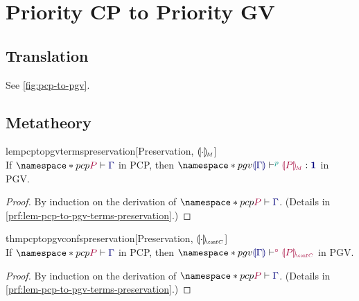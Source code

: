 \documentclass[main.tex]{subfiles}
\begin{document}
\section{Priority CP to Priority GV}

\subsection{Translation}
See \cref{fig:pcp-to-pgv}.


\subsection{Metatheory}

\begin{restatablelemma}{lempcptopgvtermspreservation}[Preservation, $\llparenthesis\cdot\rrparenthesis_{\!\scriptscriptstyle{M}}$]
  \label{lem:pcp-to-pgv-terms-preservation}
  \hfill\\%
  If $\pcp{\seq{P}{\ty{\Gamma}}}$ in PCP,
  then $\pgv{\tseq[\cs{p}]{\ty{\cpgvT{\Gamma}}}{\cpgvM{P}}{\tyunit}}$ in PGV.
\end{restatablelemma}
\begin{proof}
  By induction on the derivation of $\pcp{\seq{P}{\ty{\Gamma}}}$.
  (Details in \cref{prf:lem-pcp-to-pgv-terms-preservation}.)
\end{proof}

\begin{restatabletheorem}{thmpcptopgvconfspreservation}[Preservation, $\cpgvC{\cdot}$]
  \label{thm:pcp-to-pgv-confs-preservation}
  \hfill\\%
  If $\pcp{\seq{P}{\ty{\Gamma}}}$ in PCP,
  then $\pgv{\cseq[\child]{\ty{\cpgvT{\Gamma}}}{\cpgvC{P}}}$ in PGV.
\end{restatabletheorem}
\begin{proof}
  By induction on the derivation of $\pcp{\seq{P}{\ty{\Gamma}}}$.
  (Details in \cref{prf:lem-pcp-to-pgv-terms-preservation}.)
\end{proof}
\end{document}
